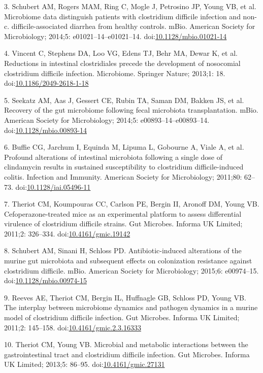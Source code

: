 \documentclass[11pt,]{article}
\begin{document}
3. Schubert AM, Rogers MAM, Ring C, Mogle J, Petrosino JP, Young VB, et
al. Microbiome data distinguish patients with clostridium difficile
infection and non-c. difficile-associated diarrhea from healthy
controls. mBio. American Society for Microbiology; 2014;5:
e01021--14--e01021--14.
doi:\href{http://dx.doi.org/10.1128/mbio.01021-14}{10.1128/mbio.01021-14}

4. Vincent C, Stephens DA, Loo VG, Edens TJ, Behr MA, Dewar K, et al.
Reductions in intestinal clostridiales precede the development of
nosocomial clostridium difficile infection. Microbiome. Springer Nature;
2013;1: 18.
doi:\href{http://dx.doi.org/10.1186/2049-2618-1-18}{10.1186/2049-2618-1-18}

5. Seekatz AM, Aas J, Gessert CE, Rubin TA, Saman DM, Bakken JS, et al.
Recovery of the gut microbiome following fecal microbiota
transplantation. mBio. American Society for Microbiology; 2014;5:
e00893--14--e00893--14.
doi:\href{http://dx.doi.org/10.1128/mbio.00893-14}{10.1128/mbio.00893-14}

6. Buffie CG, Jarchum I, Equinda M, Lipuma L, Gobourne A, Viale A, et
al. Profound alterations of intestinal microbiota following a single
dose of clindamycin results in sustained susceptibility to clostridium
difficile-induced colitis. Infection and Immunity. American Society for
Microbiology; 2011;80: 62--73.
doi:\href{http://dx.doi.org/10.1128/iai.05496-11}{10.1128/iai.05496-11}

7. Theriot CM, Koumpouras CC, Carlson PE, Bergin II, Aronoff DM, Young
VB. Cefoperazone-treated mice as an experimental platform to assess
differential virulence of clostridium difficile strains. Gut Microbes.
Informa UK Limited; 2011;2: 326--334.
doi:\href{http://dx.doi.org/10.4161/gmic.19142}{10.4161/gmic.19142}

8. Schubert AM, Sinani H, Schloss PD. Antibiotic-induced alterations of
the murine gut microbiota and subsequent effects on colonization
resistance against clostridium difficile. mBio. American Society for
Microbiology; 2015;6: e00974--15.
doi:\href{http://dx.doi.org/10.1128/mbio.00974-15}{10.1128/mbio.00974-15}

9. Reeves AE, Theriot CM, Bergin IL, Huffnagle GB, Schloss PD, Young VB.
The interplay between microbiome dynamics and pathogen dynamics in a
murine model of clostridium difficile infection. Gut Microbes. Informa
UK Limited; 2011;2: 145--158.
doi:\href{http://dx.doi.org/10.4161/gmic.2.3.16333}{10.4161/gmic.2.3.16333}

10. Theriot CM, Young VB. Microbial and metabolic interactions between
the gastrointestinal tract and clostridium difficile infection. Gut
Microbes. Informa UK Limited; 2013;5: 86--95.
doi:\href{http://dx.doi.org/10.4161/gmic.27131}{10.4161/gmic.27131}
\end{document}
